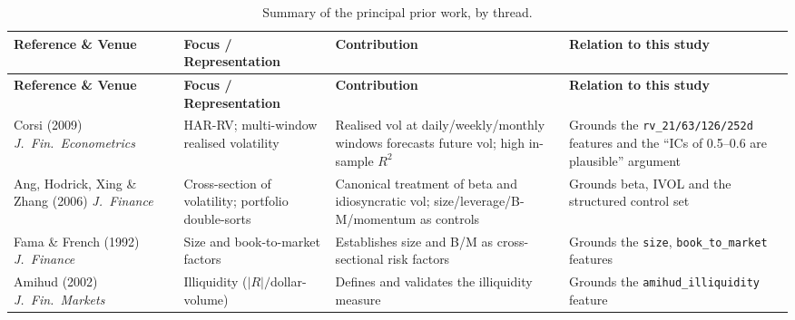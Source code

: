 \documentclass[logo,msc,ai]{infthesis}        %
\begin{document}
{\setlength{\arrayrulewidth}{0.4pt}
\renewcommand{\arraystretch}{1.2}

\noindent
\begin{longtable}{@{}L{2.4cm}L{2.6cm}L{3.7cm}L{3.7cm}@{}}
\caption{Summary of the principal prior work, by thread.}
\label{tab:survey}\\

\hline
\textbf{Reference \& Venue} &
\textbf{Focus / Representation} &
\textbf{Contribution} &
\textbf{Relation to this study} \\
\hline
\endfirsthead

\hline
\textbf{Reference \& Venue} &
\textbf{Focus / Representation} &
\textbf{Contribution} &
\textbf{Relation to this study} \\
\hline
\endhead

\hline
\endfoot

\hline
\endlastfoot

Corsi (2009) \cite{corsi2009simple}\newline \textit{J.\ Fin.\ Econometrics} &
HAR-RV; multi-window realised volatility &
Realised vol at daily/weekly/monthly windows forecasts future vol; high in-sample $R^2$ &
Grounds the \texttt{rv\_21/63/126/252d} features and the ``ICs of 0.5--0.6 are plausible'' argument \\
\hline

Ang, Hodrick, Xing \& Zhang (2006) \cite{ang2006cross}\newline \textit{J.\ Finance} &
Cross-section of volatility; portfolio double-sorts &
Canonical treatment of beta and idiosyncratic vol; size/leverage/B-M/momentum as controls &
Grounds beta, IVOL and the structured control set \\
\hline

Fama \& French (1992) \cite{fama1992cross}\newline \textit{J.\ Finance} &
Size and book-to-market factors &
Establishes size and B/M as cross-sectional risk factors &
Grounds the \texttt{size}, \texttt{book\_to\_market} features \\
\hline

Amihud (2002) \cite{amihud2002illiquidity}\newline \textit{J.\ Fin.\ Markets} &
Illiquidity ($|R|/$dollar-volume) &
Defines and validates the illiquidity measure &
Grounds the \texttt{amihud\_illiquidity} feature \\
\hline


\end{longtable}}
\end{document}
